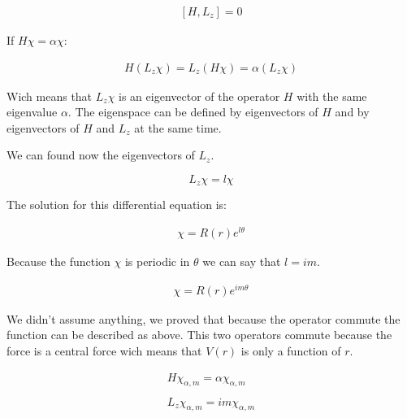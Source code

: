 \begin{equation}
  \begin{array}{c}
    [H,L_z] = 0
  \end{array}
\end{equation}

If $H\chi = \alpha \chi$:

\begin{equation}
  \begin{array}{c}
    H(L_z\chi) = L_z(H\chi) = \alpha(L_z\chi)
  \end{array}
\end{equation}

Wich means that $L_z\chi$ is an eigenvector of the operator $H$ with the same eigenvalue $\alpha$. The eigenspace can be defined by eigenvectors of $H$ and by eigenvectors of $H$ and $L_z$ at the same time.

We can found now the eigenvectors of $L_z$.

\begin{equation}
  L_z \chi = l \chi
\end{equation}

The solution for this differential equation is:

\begin{equation}
  \begin{array}{c}
    \chi = R(r) e^{l\theta}
  \end{array}
\end{equation}

Because the function $\chi$ is periodic in $\theta$ we can say that $l=i m$.

\begin{equation}
  \begin{array}{c}
    \chi = R(r) e^{i m \theta}
  \end{array}
\end{equation}

We didn't assume anything, we proved that because the operator commute the function can be described as above. This two operators commute because the force is a central force wich means that $V(r)$ is only a function of $r$.

\begin{equation}
  \begin{array}{c}
    H \chi_{\alpha,m} = \alpha \chi_{\alpha,m}
    \\

    \\
    L_z \chi_{\alpha,m} = i m \chi_{\alpha,m}
  \end{array}
\end{equation}

